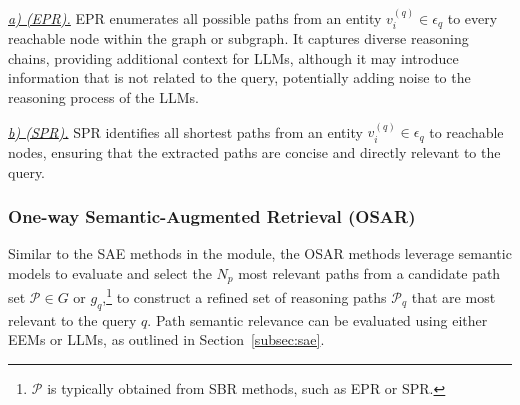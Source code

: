 {{\it \underline{a) {\GetAllPaths} (EPR).}} EPR {\cite{ref:kelp}} enumerates all possible paths from an entity \( v_i^{(q)} \in \epsilon_q \) to every reachable node within the graph or subgraph. It captures diverse reasoning chains, providing additional context for LLMs, although it may introduce information that is not related to the query, potentially adding noise to the reasoning process of the LLMs.


{\it \underline{b) {\GetShortestPaths} (SPR).}} SPR {\cite{IndexSPR,PullNet,EmbedKGQA,ScaleSPR,DecAF}} identifies all shortest paths from an entity \( v_i^{(q)} \in \epsilon_q \) to reachable nodes, ensuring that the extracted paths are concise and directly relevant
to the query.

\subsubsection{{\bf One-way Semantic-Augmented Retrieval ({\bf OSAR})}}
\label{subsubsec:OSAR}
Similar to the SAE methods in the {\preRetrieval} module, the OSAR methods leverage semantic models to evaluate and select the \( N_p \) most relevant paths from a candidate path set \( \mathcal{P}\in G \text{~or~} g_q \),\footnote{$\mathcal{P}$ is typically obtained from SBR methods, such as EPR or SPR.} to construct a refined set of reasoning paths \( \mathcal{P}_{q} \) that are most relevant to the query \( q \).
Path semantic relevance can be evaluated using either EEMs or LLMs, as outlined in Section~\ref{subsec:sae}.
}
